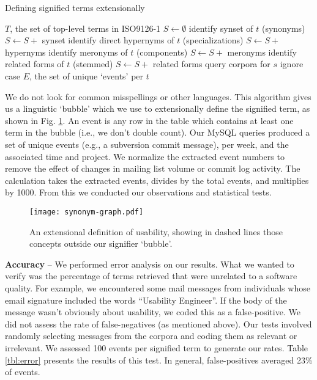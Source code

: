 \documentclass[conference, compsoc]{IEEEtran}
\begin{document}
\renewcommand{\algorithmiccomment}[1]{// #1}
\begin{algorithm}[ht]
\caption{Defining signified terms extensionally}
  \label{alg1}
\begin{algorithmic}
	\REQUIRE $T$, the set of top-level terms in ISO9126-1
	\STATE $S \leftarrow \emptyset $
	\STATE identify synset of $t$ (synonyms)%
	\STATE $S \leftarrow S +$ synset
	\STATE identify direct hypernyms of $t$ (specializations)%
	\STATE $S \leftarrow S +$ hypernyms %
	\STATE identify meronyms of $t$ (components)%
	\STATE $S \leftarrow S +$ meronyms %
	\STATE identify related forms of $t$ (stemmed)%
	\STATE $S \leftarrow S +$ related forms
		\STATE query corpora for $s$
		\COMMENT ignore case
	\ENDFOR
  \ENDFOR
\RETURN $E$, the set of unique `events' per $t$

\end{algorithmic}
\end{algorithm}
We do not look for common misspellings or other languages. This algorithm gives us a linguistic `bubble' which we use to extensionally define the signified term, as shown in Fig. \ref{fig:syngraph}. An event is any row in the table which contains at least one term in the bubble (i.e., we don't double count). Our MySQL queries produced a set of unique events (e.g., a subversion commit message), per week, and the associated time and project. We normalize the extracted event numbers to remove the effect of changes in mailing list volume or commit log activity. The calculation takes the extracted events, divides by the total events, and multiplies by 1000. From this we conducted our observations and statistical tests.

\begin{figure}[]
\centering
\texttt{[image: synonym-graph.pdf]}
\caption{An extensional definition of usability, showing in dashed lines those concepts outside our signifier `bubble'.}
\label{fig:syngraph}
\end{figure}

\noindent\textbf{Accuracy} -- We performed error analysis on our results. What we wanted to verify was the percentage of terms retrieved that were unrelated to a software quality. For example, we encountered some mail messages from individuals whose email signature included the words ``Usability Engineer''. If the body of the message wasn't obviously about usability, we coded this as a false-positive. We did not assess the rate of false-negatives (as mentioned above). Our tests involved randomly selecting messages from the corpora and coding them as relevant or irrelevant. We assessed 100 events per signified term to generate our rates. Table \ref{tbl:error} presents the results of this test. In general, false-positives averaged 23\% of events.
\end{document}
